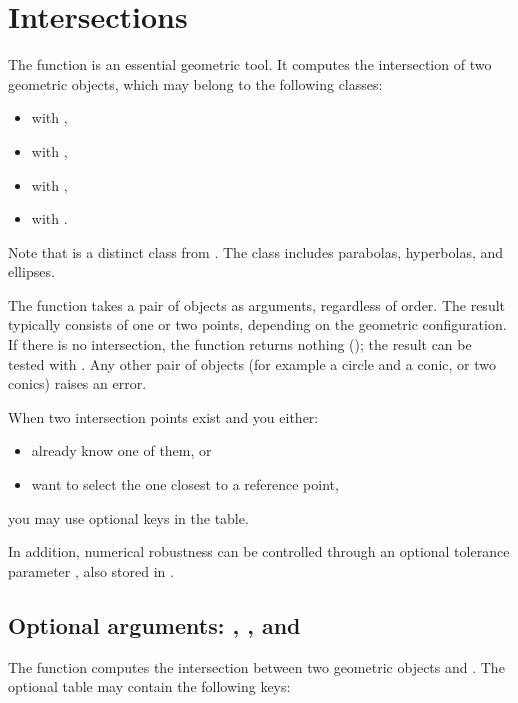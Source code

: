 \newpage
\section{Intersections}
\label{sec:intersections}

The  function is an essential geometric tool. It computes the intersection of two geometric objects, which may belong to the following classes:

\begin{itemize}
  \item {} with ,
  \item {} with ,
  \item {} with ,
  \item {} with .
\end{itemize}

Note that  is a distinct class from .
The  class includes parabolas, hyperbolas, and ellipses.

\medskip

The function takes a pair of objects as arguments, regardless of order.
The result typically consists of one or two points, depending on the geometric configuration.
If there is no intersection, the function returns nothing (); the result can be tested with . Any other pair of objects (for example a circle and a conic, or two conics) raises an error.

\medskip

When two intersection points exist and you either:
\begin{itemize}
  \item already know one of them, or
  \item want to select the one closest to a reference point,
\end{itemize}
you may use optional keys in the  table.

In addition, numerical robustness can be controlled through an optional tolerance parameter , also stored in .

\subsection{Optional arguments: , , and }

The function  computes the intersection between two geometric objects  and .
The optional table  may contain the following keys:

